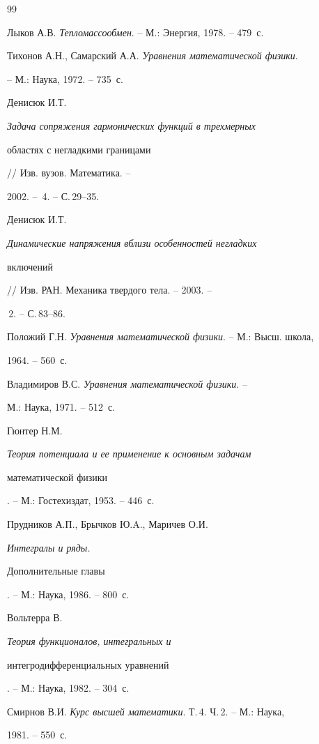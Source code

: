 




\begin{thebibliography}{99}







Лыков А.В. {\em Тепломассообмен}. -- М.: Энергия, 1978. -- 479~с.




Тихонов А.Н., Самарский А.А. {\em Уравнения математической физики}.


-- М.: Наука, 1972. -- 735~с.




Денисюк И.Т. {\em Задача сопряжения гармонических функций в трехмерных 


областях с негладкими границами} // Изв. вузов. Математика. --


2002. -- \No\,4. -- С.\,29--35.




Денисюк И.Т. {\em Динамические напряжения вблизи особенностей негладких 


включений} // Изв. РАН. Механика твердого тела. -- 2003. --


\No\,2. -- С.\,83--86.




Положий Г.Н. {\em Уравнения математической физики}. -- М.: Высш. школа,


1964. -- 560~с.




Владимиров В.С. {\em Уравнения математической физики}. --


М.: Наука, 1971. -- 512~с.




Гюнтер Н.М. {\em Теория потенциала и ее применение к основным задачам 


математической физики}. -- М.: Гостехиздат, 1953. -- 446~с.




Прудников А.П., Брычков Ю.A., Маричев О.И. {\em Интегралы и ряды. 


Дополнительные главы}. -- М.: Наука, 1986. -- 800~с.




Вольтерра В. {\em Теория функционалов, интегральных и 


интегродифференциальных уравнений}. -- М.: Наука, 1982. -- 304~с.




Смирнов В.И. {\em Курс высшей математики}. Т.\,4. Ч.\,2. -- М.: Наука,


1981. -- 550~с.





\end{thebibliography}





\vskip 1cm












\label{end}





